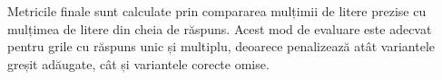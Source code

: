 \documentclass[12pt, a4paper, oneside, romanian]{teza-upb}
\begin{document}
\label{anexa:benchmark-reranking}


Metricile finale sunt calculate prin compararea mulțimii de litere prezise cu mulțimea de litere din cheia de răspuns. Acest mod de evaluare este adecvat pentru grile cu răspuns unic și multiplu, deoarece penalizează atât variantele greșit adăugate, cât și variantele corecte omise.

\label{anexa:benchmark-metrics}

\end{document}
